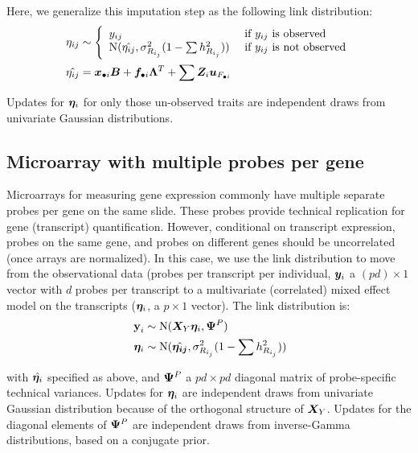 \documentclass[11pt]{amsart}
\newcommand*{\B}[1]{\ifmmode\bm{#1}\else\textbf{#1}\fi}
\begin{document}
Here, we generalize this imputation step as the following link distribution:
\begin{align} \begin{split}
\eta_{ij} &\sim \Bigg\{\begin{array}{l l}
y_{ij} & \mbox{ if } y_{ij} \mbox{ is observed} \\
\mbox{N}(\hat{\eta_{ij}},\sigma^2_{R_{i_j}}(1-\sum h^2_{R_{i_j}})) & \mbox{ if } y_{ij} \mbox{ is not observed}
\end{array} \\
\hat{\eta_{ij}} &= \B{x}_{\bullet i} \B{B} + \B{f}_{\bullet i} \B{\Lambda}^T + \sum \B{Z}_i \B{u}_{F_{\bullet i}}
\end{split}\end{align}

\noindent Updates for $\B{\eta}_i$ for only those un-observed traits are independent draws from univariate Gaussian distributions. 

\subsection{Microarray with multiple probes per gene}
Microarrays for measuring gene expression commonly have multiple separate probes per gene on the same slide. These probes provide technical replication for gene (transcript) quantification. However, conditional on transcript expression, probes on the same gene, and probes on different genes should be uncorrelated (once arrays are normalized). In this case, we use the link distribution to move from the observational data (probes per transcript per individual, $\B{y}_i$ a $(p d) \times 1$ vector with $d$ probes per transcript to a multivariate (correlated) mixed effect model on the transcripts ($\B{\eta}_i$, a $p \times 1$ vector). The link distribution is:
\begin{align} \begin{split}
\B{y}_i &\sim \mbox{N}(\B{X}_Y \B{\eta}_i, \B{\Psi}^P) \\
\;\B{\eta}_i &\sim \mbox{N}(\hat{\B{\eta_{ij}}},\sigma^2_{R_{i_j}}(1-\sum h^2_{R_{i_j}}))
\end{split}\end{align}

\noindent with $\hat{\B{\eta}_i}$ specified as above, and $\B{\Psi}^P$ a $pd \times pd$ diagonal matrix of probe-specific technical variances. Updates for $\B{\eta}_i$ are independent draws from univariate Gaussian distribution because of the orthogonal structure of $\B{X}_Y$. Updates for the diagonal elements of $\B{\Psi}^P$ are independent draws from inverse-Gamma distributions, based on a conjugate prior.
\end{document}
